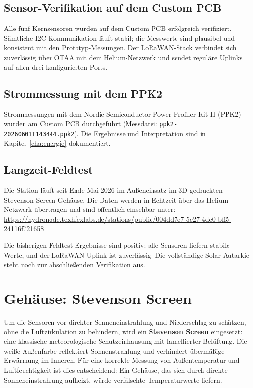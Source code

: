\subsection*{Sensor-Verifikation auf dem Custom PCB}

Alle fünf Kernsensoren wurden auf dem Custom PCB erfolgreich verifiziert. Sämtliche I2C-Kommunikation läuft stabil; die Messwerte sind plausibel und konsistent mit den Prototyp-Messungen. Der LoRaWAN-Stack verbindet sich zuverlässig über OTAA mit dem Helium-Netzwerk und sendet reguläre Uplinks auf allen drei konfigurierten Ports.

\subsection*{Strommessung mit dem PPK2}

Strommessungen mit dem Nordic Semiconductor Power Profiler Kit II (PPK2) wurden am Custom PCB durchgeführt (Messdatei: \texttt{ppk2-20260601T143444.ppk2}). Die Ergebnisse und Interpretation sind in Kapitel~\ref{cha:energie} dokumentiert.

\subsection*{Langzeit-Feldtest}

Die Station läuft seit Ende Mai 2026 im Außeneinsatz im 3D-gedruckten Stevenson-Screen-Gehäuse. Die Daten werden in Echtzeit über das Helium-Netzwerk übertragen und sind öffentlich einsehbar unter:\\
\url{https://hydronode.texhfexlabs.de/stations/public/004dd7e7-5c27-4de0-bff5-24116f721658}

Die bisherigen Feldtest-Ergebnisse sind positiv: alle Sensoren liefern stabile Werte, und der LoRaWAN-Uplink ist zuverlässig. Die vollständige Solar-Autarkie steht noch zur abschließenden Verifikation aus.

\section*{Gehäuse: Stevenson Screen}

Um die Sensoren vor direkter Sonneneinstrahlung und Niederschlag zu schützen, ohne die Luftzirkulation zu behindern, wird ein \textbf{Stevenson Screen} eingesetzt: eine klassische meteorologische Schutzeinhausung mit lamellierter Belüftung. Die weiße Außenfarbe reflektiert Sonnenstrahlung und verhindert übermäßige Erwärmung im Inneren. Für eine korrekte Messung von Außentemperatur und Luftfeuchtigkeit ist dies entscheidend: Ein Gehäuse, das sich durch direkte Sonneneinstrahlung aufheizt, würde verfälschte Temperaturwerte liefern.

